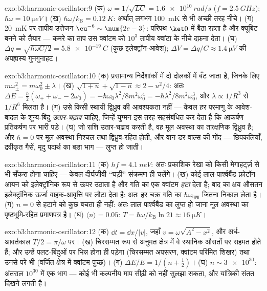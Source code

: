 \begin{solution}{exo:b3:harmonic-oscillator:9}
(क) $\omega = 1/\sqrt{LC} = \qty{1.6e10}{rad/s}$ ($f =
\qty{2.5}{GHz}$); $\hbar\omega = \qty{10}{\micro eV}$। (ख)
$\hbar\omega/k_{\text{B}} = \qty{0.12}{K}$: अर्थात् लगभग
\qty{100}{mK} से भी अच्छी तरह नीचे। (ग) \qty{20}{mK} पर तापीय उत्तेजन
$\eu^{-6} \sim \num{2e-3}$: परिपथ $\ket0$ में बैठा रहता है और
क्यूबिट बनने को तैयार --- कमरे का ताप उस क्वांटम को $10^3$
तापीय क्वांटा के नीचे दफ़ना देता। (घ) $\Delta q = \sqrt{\hbar\omega C/2} =
\qty{5.8e-19}{C}$ (कुछ इलेक्ट्रॉन-आवेश); $\Delta V = \Delta q/C
\approx \qty{1.4}{\micro V}$ की अपह्रास्य गुनगुनाहट।
\end{solution}

\begin{solution}{exo:b3:harmonic-oscillator:10}
(क) प्रसामान्य निर्देशांकों में  दो
दोलकों में बँट जाता है, जिनके लिए $m\omega_\pm^2 = m\omega_0^2 \pm \lambda$। (ख)
$\sqrt{1 + u} + \sqrt{1 - u} \approx 2 - u^2/4$: अतः $\Delta E =
\tfrac\hbar2(\omega_+ + \omega_- - 2\omega_0) =
-\hbar\omega_0\lambda^2/8m^2\omega_0^4 =
-\hbar\lambda^2/8m^2\omega_0^3$, और $\lambda \propto 1/R^3$ से
$1/R^6$ मिलता है। (ग) उसे किसी स्थायी द्विध्रुव की आवश्यकता नहीं ---
केवल हर परमाणु के आवेश-बादल के शून्य-बिंदु \emph{उतार-चढ़ाव} चाहिए,
जिन्हें युग्मन इस तरह सहसंबंधित कर देता है कि आकर्षण प्रतिकर्षण पर
भारी पड़े। (घ) जो राशि उतार-चढ़ाव करती है, वह मूल अवस्था का
तात्क्षणिक द्विध्रुव है; और $\hbar = 0$ पर मूल अवस्था निश्चल तथा
द्विध्रुव-रहित होती, और वान डर वाल्स की गोंद --- छिपकलियाँ, द्रवीकृत
गैसें, मृदु पदार्थ का बड़ा भाग --- लुप्त हो जाती।
\end{solution}

\begin{solution}{exo:b3:harmonic-oscillator:11}
(क) $hf = \qty{4.1}{neV}$: अतः प्रकाशिक रेखा को किसी मेगाहर्ट्ज़ से
भी सँकरा होना चाहिए --- केवल दीर्घजीवी ``घड़ी'' संक्रमण ही चलेंगे। (ख)
कोई लाल-पार्श्वबैंड फ़ोटॉन आयन को इलेक्ट्रॉनिक रूप से ऊपर उठाता है और
गति का एक क्वांटम \emph{हटा} देता है; बाद का क्षय औसतन इलेक्ट्रॉनिक
ऊर्जा वाहक-आवृत्ति पर लौटा देता है: अतः हर चक्र गति का
$\hbar\omega_{\text{पाश}}$ जितना निकाल लेता है। (ग) $n = 0$ से
हटाने को कुछ बचता ही नहीं: अतः लाल पार्श्वबैंड का लुप्त हो जाना मूल
अवस्था का पृष्ठभूमि-रहित प्रमाणपत्र है। (घ)
$\langle n\rangle = 0.05$: $T = \hbar\omega/k_{\text{B}}\ln21
\approx \qty{16}{\micro K}$।
\end{solution}

\begin{solution}{exo:b3:harmonic-oscillator:12}
(क) $\dd t = \dd x/|v|$, जहाँ $v = \omega\sqrt{A^2 - x^2}$, और
अर्ध-आवर्तकाल $T/2 = \pi/\omega$ पर। (ख) चिरसम्मत रूप से अनुमत क्षेत्र
में वे स्थानिक औसतों पर सहमत होते हैं; और उन्हें पलट-बिंदुओं पर भिन्न
होना ही पड़ेगा (चिरसम्मत अपसरण, क्वांटम परिमित शिखर) तथा उनसे परे भी
(वर्जित क्षेत्र में क्वांटम पुच्छ)। (ग) $\Delta E/E = 1/(n +
\tfrac12)$। (घ) $n \sim \num{3e30}$: अंतराल $10^{30}$ में एक भाग
--- कोई भी कल्पनीय माप सीढ़ी को नहीं सुलझा सकता, और यांत्रिकी
संतत दिखने लगती है।
\end{solution}

